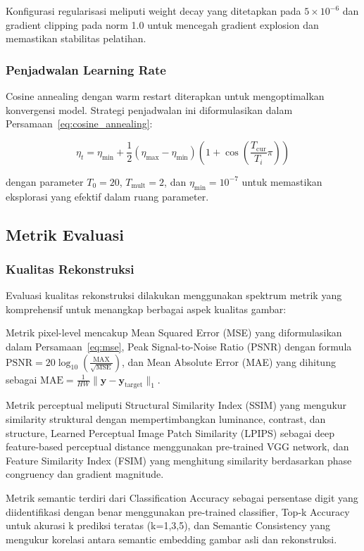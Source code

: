 Konfigurasi regularisasi meliputi weight decay yang ditetapkan pada $5 \times 10^{-6}$ dan gradient clipping pada norm 1.0 untuk mencegah gradient explosion dan memastikan stabilitas pelatihan.

\subsubsection{Penjadwalan Learning Rate}
Cosine annealing dengan warm restart diterapkan untuk mengoptimalkan konvergensi model. Strategi penjadwalan ini diformulasikan dalam Persamaan~\ref{eq:cosine_annealing}:

\begin{equation}
\eta_t = \eta_{\min} + \frac{1}{2}(\eta_{\max} - \eta_{\min})(1 + \cos(\frac{T_{\text{cur}}}{T_i}\pi))
\label{eq:cosine_annealing}
\end{equation}

dengan parameter $T_0 = 20$, $T_{\text{mult}} = 2$, dan $\eta_{\min} = 10^{-7}$ untuk memastikan eksplorasi yang efektif dalam ruang parameter.

\subsection{Metrik Evaluasi}

\subsubsection{Kualitas Rekonstruksi}
Evaluasi kualitas rekonstruksi dilakukan menggunakan spektrum metrik yang komprehensif untuk menangkap berbagai aspek kualitas gambar:

Metrik pixel-level mencakup Mean Squared Error (MSE) yang diformulasikan dalam Persamaan~\ref{eq:mse}, Peak Signal-to-Noise Ratio (PSNR) dengan formula $\text{PSNR} = 20 \log_{10}(\frac{\text{MAX}}{\sqrt{\text{MSE}}})$, dan Mean Absolute Error (MAE) yang dihitung sebagai $\text{MAE} = \frac{1}{HW}\|\mathbf{y} - \mathbf{y}_{\text{target}}\|_1$.

Metrik perceptual meliputi Structural Similarity Index (SSIM) yang mengukur similarity struktural dengan mempertimbangkan luminance, contrast, dan structure, Learned Perceptual Image Patch Similarity (LPIPS) sebagai deep feature-based perceptual distance menggunakan pre-trained VGG network, dan Feature Similarity Index (FSIM) yang menghitung similarity berdasarkan phase congruency dan gradient magnitude.

Metrik semantic terdiri dari Classification Accuracy sebagai persentase digit yang diidentifikasi dengan benar menggunakan pre-trained classifier, Top-k Accuracy untuk akurasi k prediksi teratas (k=1,3,5), dan Semantic Consistency yang mengukur korelasi antara semantic embedding gambar asli dan rekonstruksi.

